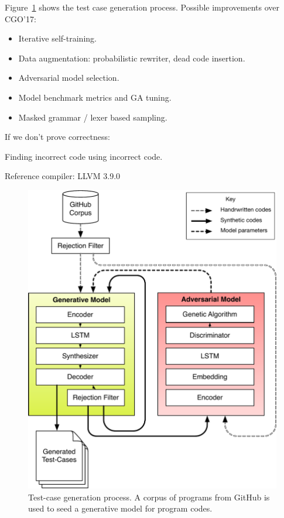 Figure~\ref{fig:deeptune} shows the test case generation process. Possible improvements over CGO'17:

\begin{itemize}
        \item Iterative self-training.
        \item Data augmentation: probabilistic rewriter, dead code insertion.
        \item Adversarial model selection.
        \item Model benchmark metrics and GA tuning.
        \item Masked grammar / lexer based sampling.
\end{itemize}

\noindent If we don't prove correctness:

Finding incorrect code using incorrect code.

Reference compiler: LLVM 3.9.0


\begin{figure}
        \centering
        \includegraphics[width=.95\columnwidth]{img/clgen} %
        \caption{%
                Test-case generation process. A corpus of programs from GitHub is used to seed a generative model for program codes.%
        }%
        \label{fig:deeptune}
\end{figure}

